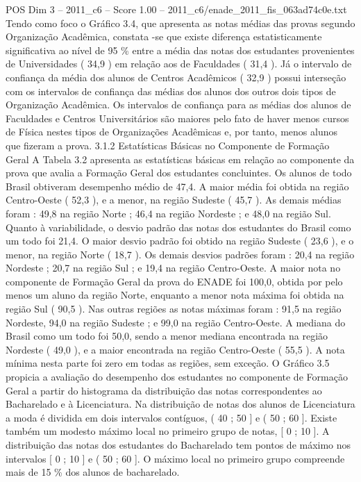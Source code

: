 \begin{textsample}{POS Dim 3 – 2011\_c6 – Score 1.00 – 2011\_c6/enade\_2011\_fis\_063ad74c0e.txt}
Tendo como foco o Gráfico 3.4, que apresenta as notas médias das provas segundo Organização Acadêmica, constata -se que existe diferença estatisticamente significativa ao nível de 95 \% entre a média das notas dos estudantes provenientes de Universidades ( 34,9 ) em relação aos de Faculdades ( 31,4 ).
Já o intervalo de confiança da média dos alunos de Centros Acadêmicos ( 32,9 ) possui interseção com os intervalos de confiança das médias dos alunos dos outros dois tipos de Organização Acadêmica.
Os intervalos de confiança para as médias dos alunos de Faculdades e Centros Universitários são maiores pelo fato de haver menos cursos de Física nestes tipos de Organizações Acadêmicas e, por tanto, menos alunos que fizeram a prova. 3.1.2 Estatísticas Básicas no Componente de Formação Geral A Tabela 3.2 apresenta as estatísticas básicas em relação ao componente da prova que avalia a Formação Geral dos estudantes concluintes.
Os alunos de todo Brasil obtiveram desempenho médio de 47,4.
A maior média foi obtida na região Centro-Oeste ( 52,3 ), e a menor, na região Sudeste ( 45,7 ).
As demais médias foram : 49,8 na região Norte ; 46,4 na região Nordeste ; e 48,0 na região Sul.
Quanto à variabilidade, o desvio padrão das notas dos estudantes do Brasil como um todo foi 21,4.
O maior desvio padrão foi obtido na região Sudeste ( 23,6 ), e o menor, na região Norte ( 18,7 ).
Os demais desvios padrões foram : 20,4 na região Nordeste ; 20,7 na região Sul ; e 19,4 na região Centro-Oeste.
A maior nota no componente de Formação Geral da prova do ENADE foi 100,0, obtida por pelo menos um aluno da região Norte, enquanto a menor nota máxima foi obtida na região Sul ( 90,5 ).
Nas outras regiões as notas máximas foram : 91,5 na região Nordeste, 94,0 na região Sudeste ; e 99,0 na região Centro-Oeste.
A mediana do Brasil como um todo foi 50,0, sendo a menor mediana encontrada na região Nordeste ( 49,0 ), e a maior encontrada na região Centro-Oeste ( 55,5 ).
A nota mínima nesta parte foi zero em todas as regiões, sem exceção.
O Gráfico 3.5 propicia a avaliação do desempenho dos estudantes no componente de Formação Geral a partir do histograma da distribuição das notas correspondentes ao Bacharelado e à Licenciatura.
Na distribuição de notas dos alunos de Licenciatura a moda é dividida em dois intervalos contíguos, ( 40 ; 50 ] e ( 50 ; 60 ].
Existe também um modesto máximo local no primeiro grupo de notas, [ 0 ; 10 ].
A distribuição das notas dos estudantes do Bacharelado tem pontos de máximo nos intervalos [ 0 ; 10 ] e ( 50 ; 60 ].
O máximo local no primeiro grupo compreende mais de 15 \% dos alunos de bacharelado.

\end{textsample}
